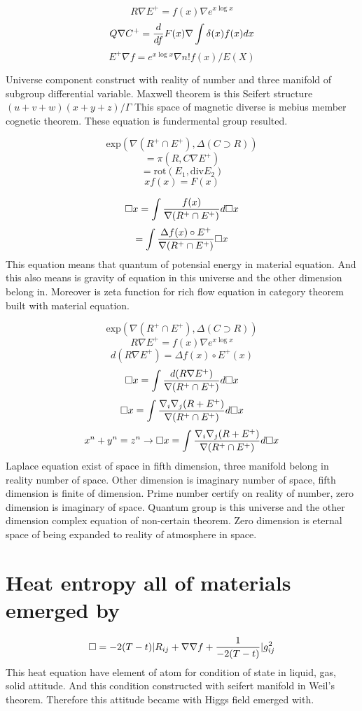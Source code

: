 \documentclass{jsarticle}
\begin{document}
 
$$ R \nabla E^{+} = f(x) \nabla e^{x\log x} $$
$$ Q \nabla C^{+} = {d \over df}F(x) \nabla \int \delta(x) f(x) dx $$
$$ E^{+} \nabla f = e^{x \log x} \nabla n! f(x) / E(X) $$

  Universe component construct with reality of number and three manifold of
subgroup differential variable.
Maxwell theorem is this Seifert structure $ (u + v + w)(x + y + z)/ \Gamma $
This space of magnetic diverse is mebius member cognetic theorem.
These equation is fundermental group resulted.

$$ \mathrm{exp}(\nabla (R^{+} \cap E^{+}), \Delta(C \supset R)) $$
$$ = \pi(R, C \nabla E^{+}) $$
$$ = \mathrm{rot}(E_{1}, \mathrm{div} E_{2})  $$
$$ xf(x) = F(x) $$

$$ \square x = \int {f(x) \over \nabla (R^{+}\cap E^{+})}d\square x  $$
$$ = \int {\Delta f(x) \circ E^{+} \over \nabla (R^{+} \cap E^{+})}\square x $$
  This equation means that quantum of potensial energy in material equation.
  And this also means is gravity of equation in this universe and the other dimension belong in.
  Moreover is zeta function for rich flow equation in category theorem built with material equation.


$$ \mathrm{exp}(\nabla (R^{+} \cap E^{+}),\Delta(C \supset R)) $$
$$ R \nabla E^{+} = f(x) \nabla e^{x \log x} $$
$$ d(R \nabla E^{+}) = \Delta f(x) \circ E^{+}(x) $$
$$ \square x = \int {d(R \nabla E^{+}) \over \nabla(R^{+}\cap E^{+})} d \square x  $$
$$ \square x = \int {\nabla_{i} \nabla_{j} (R + E^{+}) \over \nabla(R^{+} \cap E^{+})}d \square x $$
$$ x^n + y^n = z^n \to  \square x = \int {\nabla_{i} \nabla_{j} (R + E^{+}) \over \nabla(R^{+} \cap E^{+})}d \square x$$ 
  Laplace equation exist of space in fifth dimension, three manifold belong in reality number of space.
Other dimension is imaginary number of space, fifth dimension is finite of dimension.
Prime number certify on reality of number, zero dimension is imaginary of space.
Quantum group is this universe and the other dimension complex equation of non-certain theorem.
Zero dimension is eternal space of being expanded to reality of atmosphere in space.


 
\section{Heat entropy all of materials emerged by}
$$ \square = -2(T - t)|R_{ij} + \nabla \nabla f + {1 \over -2(T - t)}|g_{ij}^2 $$
  This heat equation have element of atom for condition of state in liquid, gas, solid attitude.
And this condition constructed with seifert manifold in Weil's theorem.
Therefore this attitude became with Higgs field emerged with.
\end{document}
